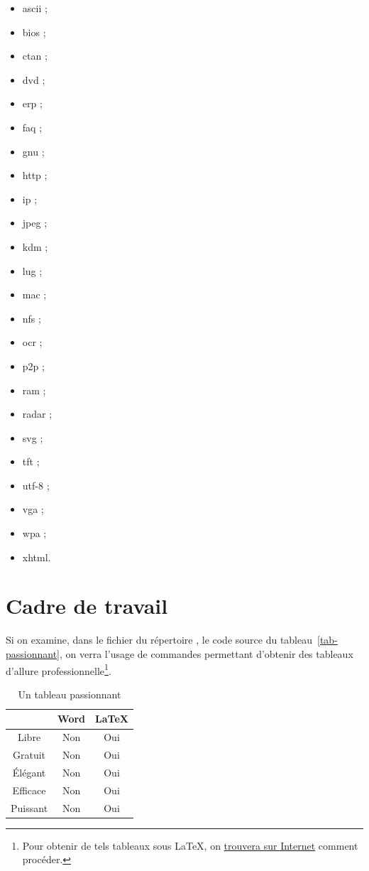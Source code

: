 \begin{itemize}
\item \gls{ascii} ;
\item \gls{bios} ;
\item \gls{ctan} ;
\item \gls{dvd} ;
\item \gls{erp} ;
\item \gls{faq} ;
\item \gls{gnu} ;
\item \gls{http} ;
\item \gls{ip} ;
\item \gls{jpeg} ;
\item \gls{kdm} ;
\item \gls{lug} ;
\item \gls{mac} ;
\item \gls{nfs} ;
\item \gls{ocr} ;
\item \gls{p2p} ;
\item \gls{ram} ;
\item \gls{radar} ;
\item \gls{svg} ;
\item \gls{tft} ;
\item \gls{utf-8} ;
\item \gls{vga} ;
\item \gls{wpa} ;
\item \gls{xhtml}.
\end{itemize}
%
\section{Cadre de travail}\label{sec-cadre}
%
Si on examine, dans le fichier
 du répertoire , le code source
du tableau~\vref{tab-passionnant}, on verra l'usage
de commandes permettant d'obtenir des tableaux d'allure
professionnelle\footnote{Pour obtenir de tels tableaux sous \LaTeX{}, on
  \href{https://www.tug.org/pracjourn/2007-1/mori/mori.pdf}{trouvera sur
    Internet} comment procéder.}.
%
\begin{table}[ht]
  \centering
  \begin{tabular}{ccc}
    \toprule
    \multicolumn{1}{c}{} & Word & \LaTeX{} \\
    \midrule
    Libre                & Non  & Oui      \\
    Gratuit              & Non  & Oui      \\
    Élégant              & Non  & Oui      \\
    Efficace             & Non  & Oui      \\
    Puissant             & Non  & Oui      \\
    \bottomrule
  \end{tabular}
  \caption{Un tableau passionnant}
  \label{tab-passionnant}
\end{table}

